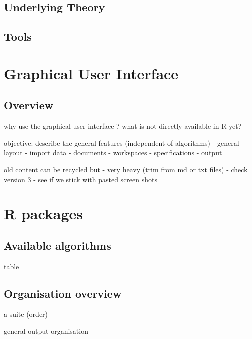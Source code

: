 \documentclass[
  letterpaper,
  DIV=11,
  numbers=noendperiod]{scrreprt}
\begin{document}
\hypertarget{underlying-theory-2}{%
\section{Underlying Theory}\label{underlying-theory-2}}

\hypertarget{tools-6}{%
\section{Tools}\label{tools-6}}

\hypertarget{graphical-user-interface}{%
\chapter{Graphical User Interface}\label{graphical-user-interface}}

\hypertarget{overview}{%
\section{Overview}\label{overview}}

why use the graphical user interface ? what is not directly available in
R yet?

objective: describe the general features (independent of algorithms) -
general layout - import data - documents - workspaces - specifications -
output

old content can be recycled but - very heavy (trim from md or txt files)
- check version 3 - see if we stick with pasted screen shots

\hypertarget{r-packages}{%
\chapter{R packages}\label{r-packages}}

\hypertarget{available-algorithms}{%
\section{Available algorithms}\label{available-algorithms}}

table

\hypertarget{organisation-overview}{%
\section{Organisation overview}\label{organisation-overview}}

a suite (order)

general output organisation
\end{document}
